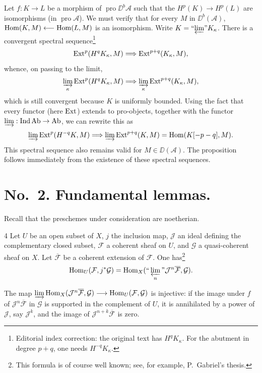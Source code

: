 Let $f:K\to L$ be a morphism of $\operatorname{pro}\DD^b\mathcal A$ such that the $H^p(K)\to H^p(L)$ are isomorphisms (in $\operatorname{pro}\mathcal A$). We must verify that for every $M$ in $\DD^b(\mathcal A)$, $\operatorname{Hom}(K,M)\longleftarrow\operatorname{Hom}(L,M)$ is an isomorphism. Write $K=\text{``$\varprojlim$''}K_{\kappa}$. There is a convergent spectral sequence\footnote{Editorial index correction: the original text has $H^qK_{\kappa}$. For the abutment in degree $p+q$, one needs $H^{-q}K_{\kappa}$.}
\[
\operatorname{Ext}^p(H^{q}K_{\kappa},M)\Longrightarrow\operatorname{Ext}^{p+q}(K_{\kappa},M),
\]
whence, on passing to the limit,
\[
\varinjlim_{\kappa}\operatorname{Ext}^p(H^{q}K_{\kappa},M)
\Longrightarrow\varinjlim_{\kappa}\operatorname{Ext}^{p+q}(K_{\kappa},M),
\]
which is still convergent because $K$ is uniformly bounded. Using the fact that every
functor (here $\operatorname{Ext}$) extends to pro-objects, together with the functor
$\varinjlim:\operatorname{Ind}\operatorname{Ab}\to\operatorname{Ab}$, we can rewrite this as
\[
\varinjlim\operatorname{Ext}^p(H^{-q}K,M)
\Longrightarrow\varinjlim\operatorname{Ext}^{p+q}(K,M)
=\operatorname{Hom}(K[-p-q],M).
\]
This spectral sequence also remains valid for $M\in\DD(\mathcal A)$. The proposition follows immediately from the existence of these spectral sequences.

\section*{No.\ 2. Fundamental lemmas.}\label{appen:sec2}

Recall that the preschemes under consideration are noetherian.

\begin{bookproposition}{4}\label{appen:prop4}
Let $U$ be an open subset of $X$, $j$ the inclusion map, $\mathcal J$ an ideal defining the complementary closed subset, $\mathcal F$ a coherent sheaf on $U$, and $\mathcal G$ a quasi-coherent sheaf on $X$. Let $\overline{\mathcal F}$ be a coherent extension of $\mathcal F$. One has\footnote{This formula is of course well known; see, for example, P.\ Gabriel's thesis.}
\[
\operatorname{Hom}_{U}(\mathcal{F}, j^{*}\mathcal{G}) = \operatorname{Hom}_{X}(\text{``}\varprojlim_n\text{''} \mathcal{J}^{n}\overline{\mathcal{F}}, \mathcal{G}).
\]
\end{bookproposition}

The map $\varinjlim\operatorname{Hom}_X(\mathcal J^n\overline{\mathcal F},\mathcal G)\longrightarrow\operatorname{Hom}_U(\mathcal F,\mathcal G)$ is injective: if the image under $f$ of $\mathcal J^n\overline{\mathcal F}$ in $\mathcal G$ is supported in the complement of $U$, it is annihilated by a power of $\mathcal J$, say $\mathcal J^k$, and the image of $\mathcal J^{n+k}\overline{\mathcal F}$ is zero.

